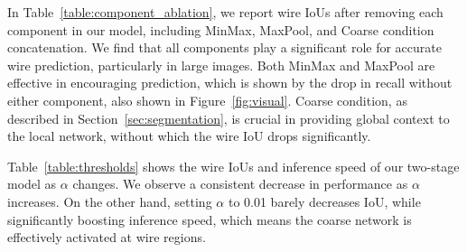 

% 


% 

In Table~\ref{table:component_ablation}, we report wire IoUs after removing each component in our model, including MinMax, MaxPool, and Coarse condition concatenation. We find that all components play a significant role for accurate wire prediction, particularly in large images. Both MinMax and MaxPool are effective in encouraging prediction, which is shown by the drop in recall without either component, also shown in Figure~\ref{fig:visual}. Coarse condition, as described in Section~\ref{sec:segmentation}, is crucial in providing global context to the local network, without which the wire IoU drops significantly.

Table~\ref{table:thresholds} shows the wire IoUs and inference speed of our two-stage model as $\alpha$ changes. We observe a consistent decrease in performance as $\alpha$ increases. On the other hand, setting $\alpha$ to 0.01 barely decreases IoU, while significantly boosting inference speed, which means the coarse network is effectively activated at wire regions.

